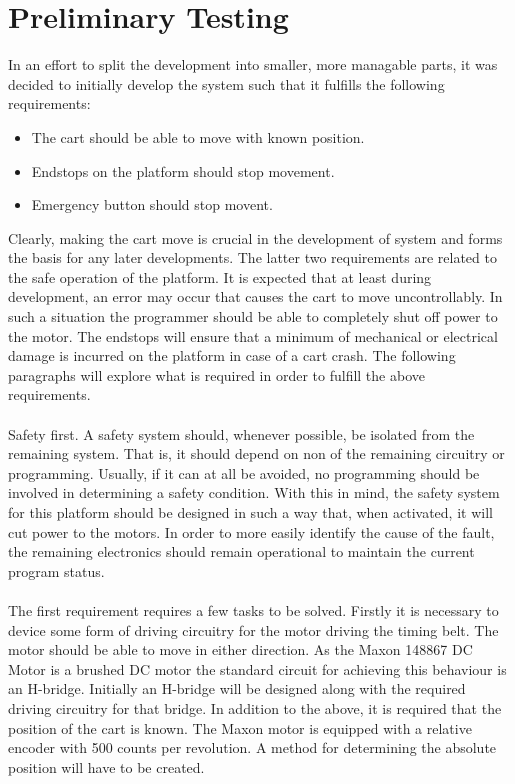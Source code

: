 \section{Preliminary Testing} %
\label{sec:preliminary_testing}
In an effort to split the development into smaller, more managable parts, it was decided to initially develop the system such that it fulfills the following requirements:

\begin{itemize}
	\item The cart should be able to move with known position.
	\item Endstops on the platform should stop movement.
	\item Emergency button should stop movent.
\end{itemize}

Clearly, making the cart move is crucial in the development of system and forms the basis for any later developments.
The latter two requirements are related to the safe operation of the platform.
It is expected that at least during development, an error may occur that causes the cart to move uncontrollably.
In such a situation the programmer should be able to completely shut off power to the motor.
The endstops will ensure that a minimum of mechanical or electrical damage is incurred on the platform in case of a cart crash.
The following paragraphs will explore what is required in order to fulfill the above requirements.
\\~\\
Safety first.
A safety system should, whenever possible, be isolated from the remaining system.
That is, it should depend on non of the remaining circuitry or programming.
Usually, if it can at all be avoided, no programming should be involved in determining a safety condition.
With this in mind, the safety system for this platform should be designed in such a way that, when activated, it will cut power to the motors.
In order to more easily identify the cause of the fault, the remaining electronics should remain operational to maintain the current program status.
\\~\\
The first requirement requires a few tasks to be solved.
Firstly it is necessary to device some form of driving circuitry for the motor driving the timing belt.
The motor should be able to move in either direction.
As the Maxon 148867 DC Motor is a brushed DC motor the standard circuit for achieving this behaviour is an H-bridge.
Initially an H-bridge will be designed along with the required driving circuitry for that bridge.
In addition to the above, it is required that the position of the cart is known.
The Maxon motor is equipped with a relative encoder with 500 counts per revolution.
A method for determining the absolute position will have to be created.
